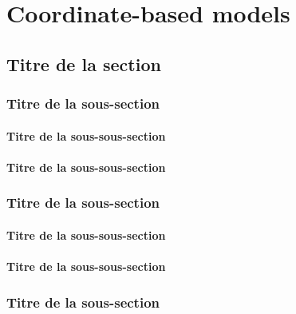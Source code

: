 \chapter{Coordinate-based models} %


\section{Titre de la section}
\subsection{Titre de la sous-section}
\cite{Ruppell1842}
\subsubsection{Titre de la sous-sous-section}
\subsubsection{Titre de la sous-sous-section}


\subsection{Titre de la sous-section}

\subsubsection{Titre de la sous-sous-section}

\subsubsection{Titre de la sous-sous-section}

\subsection{Titre de la sous-section}


